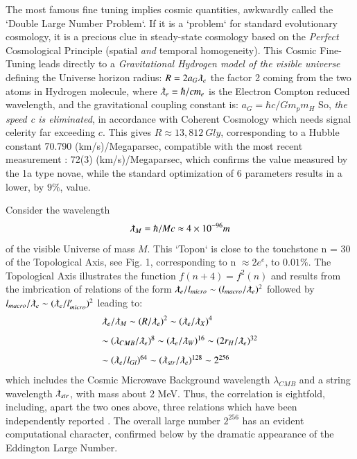 \documentclass[twoside,draft]{article}
\begin{document}
\begin{sloppypar}
{The most famous fine tuning implies cosmic quantities, awkwardly called the `Double
Large Number Problem`. If it is a `problem` for standard evolutionary cosmology, it is a precious
clue in steady-state cosmology based on the \textit{Perfect} Cosmological Principle (spatial \textit{and} temporal homogeneity).
This Cosmic Fine-Tuning leads directly to a \textit{Gravitational Hydrogen model of the visible universe} \cite{Sanchez1}
defining the Universe horizon radius: $R = 2a_{G} \lambdabar_{e}$ the factor 2 coming from the two atoms in
Hydrogen molecule, where 
$\lambdabar_{e} = \hbar/cm_{e}$
is the Electron Compton reduced wavelength, and the
gravitational coupling constant is: 
$a_{G} = \hbar c/Gm_{p}m_{H}$
So, \textit{the speed c is eliminated}, in accordance with
Coherent Cosmology which needs signal celerity far exceeding $c$. This gives $R \approx 13,812~Gly $, corresponding to a Hubble constant 70.790 (km/s)/Megaparsec, compatible with the
most recent measurement \cite{Bonvin}: 72(3) (km/s)/Megaparsec, which confirms the value measured by the 1a type novae, while the standard optimization of 6 parameters results in a lower, by $9\%$, value.

Consider the wavelength $$\lambdabar_{M} = \hbar /Mc \approx 4 \times 10^{-96} m$$ of the visible Universe of mass $M$. This `Topon` is close to the touchstone n = 30 of the Topological Axis, see Fig. 1,
corresponding to n $\approx 2e^{e}$, to $0.01\%$. The Topological Axis illustrates the function $f(n + 4) = f^{2}(n)$
and results from the imbrication of relations of the form 
$
\lambdabar_{e} /l_{micro} \sim (l_{macro} /\lambdabar_{e})^{2}
$
followed by 
$
l_{macro} /\lambdabar_{e} \sim (\lambdabar_{e} /l^{\prime}_{micro} )^{2}
$ leading to:
$$
\begin{array}{ll}
%
\displaystyle
\lambdabar_{e}/\lambdabar_{M} \sim (R/\lambdabar_{e})^{2} \sim (\lambdabar_{e}/ \lambdabar_{X})^{4}\\[+8pt]  %
\sim (\lambda_{CMB}/ \lambdabar_{e})^{8} \sim (\lambdabar_{e}/\lambdabar_{W})^{16} \sim (2r_{H} /\lambdabar_{e})^{32}\\[+8pt] %
\sim (\lambdabar_{e}/ l_{Gl} )^{64} \sim (\lambdabar_{str} /\lambdabar_{e} )^{128} \sim 2^{256}\\ %
\end{array}
$$
which includes the Cosmic Microwave Background wavelength $\lambda_{CMB}$ and a string wavelength $\lambdabar_{str}$, with mass about 2 MeV. Thus, the correlation is eightfold,
including, apart the two ones above, three relations which have been independently reported \cite{Sanchez1}.
The overall large number $2^{256}$ has an evident computational character, confirmed below by the
dramatic appearance of the Eddington Large Number.

}
\end{sloppypar}
\end{document}
